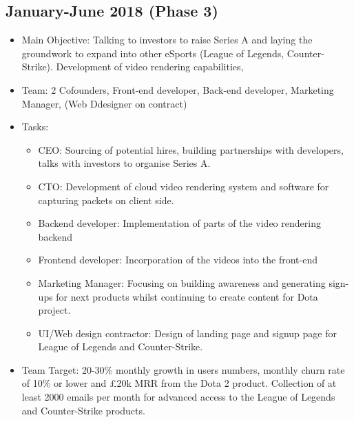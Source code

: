 \documentclass[12pt]{article} %
\begin{document}
\subsection[Jan.-June 2018 (Phase 3)]{January-June 2018 (Phase 3)}
\begin{itemize}
    \item Main Objective: Talking to investors to raise Series A and laying the groundwork to expand into other eSports (League of Legends, Counter-Strike). Development of video rendering capabilities,
\item Team:  2 Cofounders, Front-end developer, Back-end developer, Marketing Manager, (Web Ddesigner on contract)
\item Tasks:
\begin{itemize}
\item CEO: Sourcing of potential hires, building partnerships with developers, talks with investors to organise Series A.
\item CTO: Development of cloud video rendering system and software for capturing packets on client side.
\item Backend developer:  Implementation of parts of the video rendering backend
\item Frontend developer: Incorporation of the videos into the front-end
\item Marketing Manager: Focusing on building awareness and generating sign-ups for next products whilst continuing to create content for Dota project.
\item UI/Web design contractor: Design of landing page and signup page for League of Legends and Counter-Strike.
\end{itemize}
\item Team Target: 20-30\% monthly growth in users numbers, monthly churn rate of 10\% or lower and \pounds20k MRR from the Dota 2 product. Collection of at least 2000 emails per month for advanced access to the League of Legends and Counter-Strike products.
\end{itemize}
\end{document}
